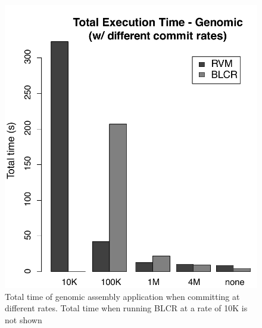 \begin{figure}[t!]
\begin{center}
\includegraphics[scale=0.40]{graphs/genome_total_time_commit.pdf}
\end{center}
\caption{Total time of genomic assembly application when committing at different rates. Total time when running BLCR at a rate of 10K is not shown}
\label{fig:genome_total_time_commit}
\end{figure}
